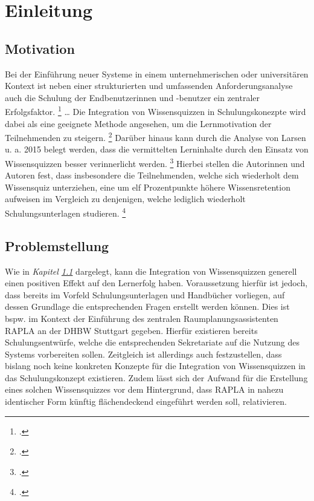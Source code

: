 \chapter{Einleitung}
\section{Motivation}\label{sec:motivation}
Bei der Einführung neuer Systeme in einem unternehmerischen oder universitären
Kontext ist neben einer strukturierten und umfassenden Anforderungsanalyse
auch
die Schulung der Endbenutzerinnen und -benutzer ein zentraler Erfolgsfaktor.
\footcite[Vgl.][S. 189 ff.]{leeEmpiricalStudyRelationships1995}
\dots
Die Integration von Wissensquizzen in Schulungskonezpte wird dabei
als eine geeignete Methode angesehen, um die Lernmotivation der Teilnehmenden zu steigern.
\footcites[Vgl.][83]{huangEmpoweringEndUsers1998}[1080]{maurerEQuizSimpleTool2007}[147]{paaERPEndUserTrainingELearning2014}
Darüber hinaus kann durch die Analyse von Larsen u. a. 2015 belegt werden, dass
die vermittelten Lerninhalte durch den Einsatz von Wissensquizzen besser verinnerlicht werden.
\footcite[Vgl.][S. 748 ff.]{larsenEffectsTestenhancedLearning2015}
Hierbei stellen die Autorinnen und Autoren fest, dass insbesondere die Teilnehmenden, welche
sich wiederholt dem Wissensquiz unterziehen, eine um elf Prozentpunkte höhere Wissensretention
aufweisen im Vergleich zu denjenigen, welche lediglich wiederholt Schulungsunterlagen studieren.
\footcite[Vgl.][748]{larsenEffectsTestenhancedLearning2015}
\section{Problemstellung}
Wie in \textit{Kapitel \ref{sec:motivation}} dargelegt, kann die Integration von Wissensquizzen
generell einen positiven Effekt auf den Lernerfolg haben. Voraussetzung hierfür ist jedoch, dass
bereits im Vorfeld Schulungsunterlagen und Handbücher vorliegen, auf dessen Grundlage
die entsprechenden Fragen erstellt werden können. Dies ist bspw. im Kontext
der Einführung des zentralen Raumplanungsassistenten \ac{RAPLA} an der \ac{DHBW} Stuttgart
gegeben. Hierfür existieren bereits Schulungsentwürfe, welche
die entsprechenden Sekretariate auf die Nutzung des Systems vorbereiten sollen.
Zeitgleich ist allerdings auch festzustellen, dass bislang noch keine
konkreten Konzepte für die Integration von Wissensquizzen in das Schulungskonzept
existieren. Zudem lässt sich der Aufwand für die Erstellung eines solchen
Wissensquizzes vor dem Hintergrund, dass \ac{RAPLA} in nahezu
identischer Form künftig flächendeckend
eingeführt werden soll, relativieren.



